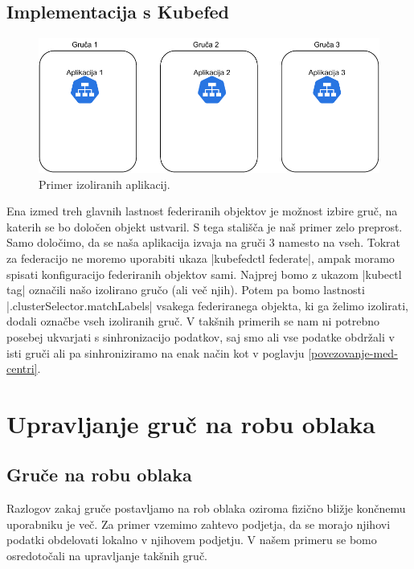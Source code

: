 \documentclass[a4paper, 12pt]{book}
\begin{document}
\section{Implementacija s Kubefed}
\begin{figure}[h]
\begin{center}
  \includegraphics[width=1.0\textwidth]{images/primer-izolirane-aplikacije.pdf}
\end{center}
\caption{Primer izoliranih aplikacij.}
\label{problem-prevelike-latence}
\end{figure}
Ena izmed treh glavnih lastnost federiranih objektov je možnost izbire gruč, na katerih se bo določen objekt ustvaril. 
S tega stališča je naš primer zelo preprost.
Samo določimo, da se naša aplikacija izvaja na gruči 3 namesto na vseh.
Tokrat za federacijo ne moremo uporabiti ukaza \spverb|kubefedctl federate|, ampak moramo spisati konfiguracijo federiranih objektov sami.
Najprej bomo z ukazom \spverb|kubectl tag| označili našo izolirano gručo (ali več njih).
Potem pa bomo lastnosti \spverb|.clusterSelector.matchLabels| vsakega federiranega objekta, ki ga želimo izolirati, dodali označbe vseh izoliranih gruč.
V takšnih primerih se nam ni potrebno posebej ukvarjati s sinhronizacijo podatkov, saj smo ali vse podatke obdržali v isti gruči ali pa sinhroniziramo na enak način kot v poglavju \ref{povezovanje-med-centri}.
\chapter{Upravljanje gruč na robu oblaka}
\label{edge-clusters}
\section{Gruče na robu oblaka}
Razlogov zakaj gruče postavljamo na rob oblaka oziroma fizično bližje konč\-ne\-mu uporabniku je več.
Za primer vzemimo zahtevo podjetja, da se morajo njihovi podatki obdelovati lokalno v njihovem podjetju.
V našem primeru se bomo osredotočali na upravljanje takšnih gruč.
\end{document}
